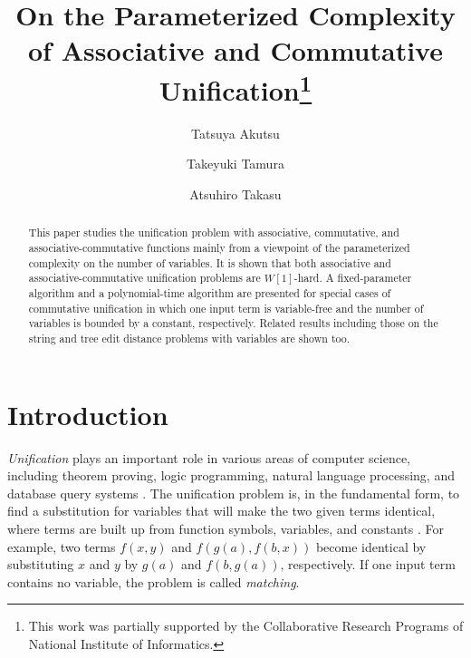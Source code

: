 \documentclass[a4paper]{llncs}
\begin{document}
\title{On the Parameterized Complexity of Associative and Commutative Unification\thanks{
This work was partially supported by the Collaborative Research Programs
of National Institute of Informatics.}}
\titlerunning{}

\author{Tatsuya Akutsu
\and Takeyuki Tamura
\and 
Atsuhiro Takasu}


\maketitle

\begin{abstract}
This paper studies the unification problem with
associative, commutative, and associative-commutative functions mainly
from a viewpoint of the parameterized complexity on the number of
variables.
It is shown that
both associative and associative-commutative unification problems
are $W[1]$-hard.
A fixed-parameter algorithm and a polynomial-time algorithm are presented for
special cases of commutative unification in which
one input term is variable-free and the number of variables is bounded by 
a constant, respectively.
Related results including those on
the string and tree edit distance problems with variables are shown too.
\end{abstract}

\section{Introduction}

\emph{Unification} plays an important role in various areas of computer science,
including theorem proving, logic programming, natural language processing,
and database query systems \cite{kapur92,knight89}.
The unification problem is, in the fundamental form,
to find a substitution for variables that will make the two given
terms identical, where terms are built up from function symbols, 
variables, and constants \cite{knight89}.
For example, two terms $f(x,y)$ and $f(g(a),f(b,x))$ become identical
by substituting $x$ and $y$ by $g(a)$ and $f(b,g(a))$, respectively.
If one input term contains no variable, the problem is called \emph{matching}.
\end{document}
